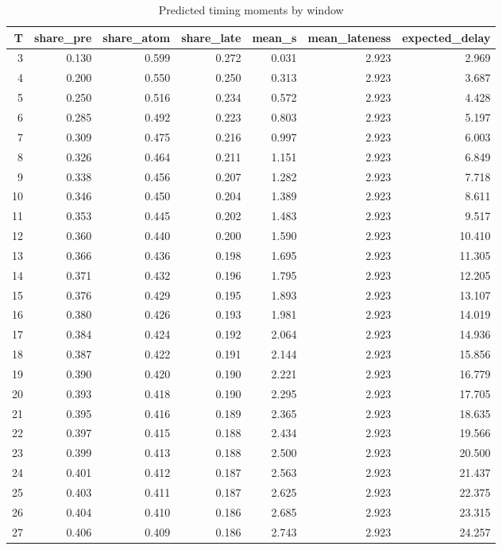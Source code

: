 \begin{table}
\caption{Predicted timing moments by window}
\label{tab:curves}
\begin{tabular}{rrrrrrr}
\toprule
T & share\_pre & share\_atom & share\_late & mean\_s & mean\_lateness & expected\_delay \\
\midrule
3 & 0.130 & 0.599 & 0.272 & 0.031 & 2.923 & 2.969 \\
4 & 0.200 & 0.550 & 0.250 & 0.313 & 2.923 & 3.687 \\
5 & 0.250 & 0.516 & 0.234 & 0.572 & 2.923 & 4.428 \\
6 & 0.285 & 0.492 & 0.223 & 0.803 & 2.923 & 5.197 \\
7 & 0.309 & 0.475 & 0.216 & 0.997 & 2.923 & 6.003 \\
8 & 0.326 & 0.464 & 0.211 & 1.151 & 2.923 & 6.849 \\
9 & 0.338 & 0.456 & 0.207 & 1.282 & 2.923 & 7.718 \\
10 & 0.346 & 0.450 & 0.204 & 1.389 & 2.923 & 8.611 \\
11 & 0.353 & 0.445 & 0.202 & 1.483 & 2.923 & 9.517 \\
12 & 0.360 & 0.440 & 0.200 & 1.590 & 2.923 & 10.410 \\
13 & 0.366 & 0.436 & 0.198 & 1.695 & 2.923 & 11.305 \\
14 & 0.371 & 0.432 & 0.196 & 1.795 & 2.923 & 12.205 \\
15 & 0.376 & 0.429 & 0.195 & 1.893 & 2.923 & 13.107 \\
16 & 0.380 & 0.426 & 0.193 & 1.981 & 2.923 & 14.019 \\
17 & 0.384 & 0.424 & 0.192 & 2.064 & 2.923 & 14.936 \\
18 & 0.387 & 0.422 & 0.191 & 2.144 & 2.923 & 15.856 \\
19 & 0.390 & 0.420 & 0.190 & 2.221 & 2.923 & 16.779 \\
20 & 0.393 & 0.418 & 0.190 & 2.295 & 2.923 & 17.705 \\
21 & 0.395 & 0.416 & 0.189 & 2.365 & 2.923 & 18.635 \\
22 & 0.397 & 0.415 & 0.188 & 2.434 & 2.923 & 19.566 \\
23 & 0.399 & 0.413 & 0.188 & 2.500 & 2.923 & 20.500 \\
24 & 0.401 & 0.412 & 0.187 & 2.563 & 2.923 & 21.437 \\
25 & 0.403 & 0.411 & 0.187 & 2.625 & 2.923 & 22.375 \\
26 & 0.404 & 0.410 & 0.186 & 2.685 & 2.923 & 23.315 \\
27 & 0.406 & 0.409 & 0.186 & 2.743 & 2.923 & 24.257 \\

\end{tabular}
\end{table}
